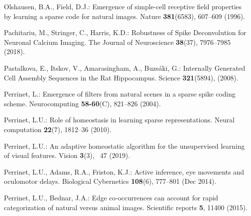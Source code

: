 \documentclass[runningheads]{llncs}
\begin{document}
{\begin{thebibliography}{10}
Olshausen, B.A., Field, D.J.: Emergence of simple-cell receptive field
  properties by learning a sparse code for natural images. Nature
  \textbf{381}(6583),  607--609 (1996). %

Pachitariu, M., Stringer, C., Harris, K.D.: Robustness of {Spike}
  {Deconvolution} for {Neuronal} {Calcium} {Imaging}. The Journal of
  Neuroscience  \textbf{38}(37),  7976--7985 (2018).

Pastalkova, E., Itskov, V., Amarasingham, A., Buzsáki, G.: Internally
  {Generated} {Cell} {Assembly} {Sequences} in the {Rat} {Hippocampus}. Science \textbf{321}(5894), %
  (2008).

Perrinet, L.: Emergence of filters from natural scenes in a sparse spike coding
  scheme. Neurocomputing  \textbf{58-60}(C),  821--826 (2004).

Perrinet, L.U.: Role of homeostasis in learning sparse representations. Neural
  computation  \textbf{22}(7),  1812--36 (2010).

Perrinet, L.U.: An adaptive homeostatic algorithm for the unsupervised learning
  of visual features. Vision  \textbf{3}(3), ~47 (2019). %

Perrinet, L.U., Adams, R.A., Friston, K.J.: Active inference, eye movements and
  oculomotor delays. Biological Cybernetics  \textbf{108}(6),  777--801 (Dec
  2014). %

Perrinet, L.U., Bednar, J.A.: Edge co-occurrences can account for rapid
  categorization of natural versus animal images. Scientific reports
  \textbf{5},  11400 (2015). %


\end{thebibliography}}
\end{document}
